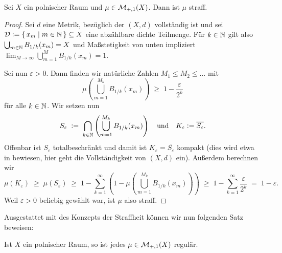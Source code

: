 \documentclass[../main/main.tex]{subfiles}
\begin{document}
	\begin{Satz}
		\label{thm:tightness}
		Sei $X$ ein polnischer Raum und $\mu \in \mathcal{M}_{+,1}(X)$. Dann ist $\mu$ straff.
	\end{Satz}
	
	\begin{proof}
		Sei $d$ eine Metrik, bezüglich der $(X, d)$ vollständig ist und sei 
		$\mathcal{D} \vcentcolon = \left\{\, x_m \; \middle| \; m \in \mathbb{N} \,\right\} \subseteq X$ eine abzählbare dichte Teilmenge. 
		Für $k \in \mathbb{N}$ gilt also $\bigcup_{m \in \mathbb{N}} B_{1/k}(x_m) = X$ und Maßstetigkeit 
		von unten impliziert 
		$\lim_{M \to \infty} \bigcup_{m=1}^{M} B_{1/k}(x_m) = 1$.
		
		Sei nun $\varepsilon > 0$. Dann finden wir natürliche Zahlen $M_1 \leq M_2 \leq \dots$ mit
		\[ \mu\left( \bigcup_{m=1}^{M_k} B_{1/k}(x_m) \right) \; \geq \; 1 - \frac{\varepsilon}{2^k} \]
		für alle $k \in \mathbb{N}$. Wir setzen nun
		\[ S_\varepsilon 
		\; \vcentcolon = \; \bigcap_{k \in \mathbb{N}} \left( \bigcup_{m=1}^{M_k} B_{1/k}(x_m) \right) 
		\quad \text{und} \quad K_\varepsilon \vcentcolon = \overline{S_\varepsilon} \text{.} \]
		Offenbar ist $S_\varepsilon$ totalbeschränkt und damit ist $K_\varepsilon = \overline{S_\varepsilon}$ 
		kompakt (dies wird etwa in \cite[Satz 2.3.8]{Simon.2015} bewiesen, 
		hier geht die Vollständigkeit von $(X, d)$ ein).
		Außerdem berechnen wir
		\[ \mu(K_\varepsilon) 
		\; \geq \; \mu(S_\varepsilon) 
		\; \geq \; 1 - \sum_{k=1}^{\infty} \left( 1 - \mu\left( \bigcup_{m=1}^{M_k} B_{1/k}(x_m) \right) \right) 
		\; \geq \; 1 - \sum_{k=1}^{\infty} \frac{\varepsilon}{2^k} \; = \; 1 - \varepsilon \text{.} \]
		Weil $\varepsilon > 0$ beliebig gewählt war, ist $\mu$ also straff.
	\end{proof}
	
	Ausgestattet mit des Konzepts der Straffheit können wir nun folgenden Satz beweisen:
	
	\begin{Korollar}
		Ist $X$ ein polnischer Raum, so ist jedes $\mu \in \mathcal{M}_{+,1}(X)$ regulär.
	\end{Korollar}
	
\end{document}
